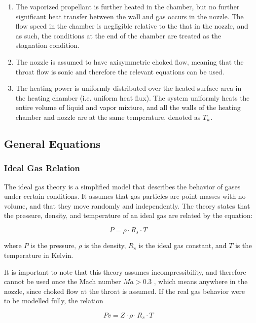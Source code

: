 \documentclass{homework}
\begin{document}
\begin{multicols}{2}
\begin{enumerate}
    \item The vaporized propellant is further heated in the chamber, but no further significant heat transfer between the wall and gas occurs in the nozzle. The flow speed in the chamber is negligible relative to the that in the nozzle, and as such, the conditions at the end of the chamber are treated as the stagnation condition.
    
    \item The nozzle is assumed to have axisymmetric choked flow, meaning that the throat flow is sonic and therefore the relevant equations can be used.
    
    \item The heating power is uniformly distributed over the heated surface area in the heating chamber (i.e. uniform heat flux). The system uniformly heats the entire volume of liquid and vapor mixture, and all the walls of the heating chamber and nozzle are at the same temperature, denoted as $T_w$.
    
\end{enumerate}

\subsection{General Equations}

\subsubsection{Ideal Gas Relation}
	    
	  The ideal gas theory is a simplified model that describes the behavior of gases under certain conditions. It assumes that gas particles are point masses with no volume, and that they move randomly and independently. The theory states that the pressure, density, and temperature of an ideal gas are related by the equation:  
	    
	  $$ P = \rho \cdot R_s \cdot T $$  
	    
	  where $P$ is the pressure, $\rho$ is the density, $R_s$ is the ideal gas constant, and $T$ is the temperature in Kelvin.  
	    
	  It is important to note that this theory assumes incompressibility, and therefore cannot be used once the Mach number $ Ma > 0.3$ , which means anywhere in the nozzle, since choked flow at the throat is assumed. If the real gas behavior were to be modelled fully, the relation

        $$P v= Z \cdot \rho \cdot R_s \cdot T$$ 


\end{multicols}
\end{document}
